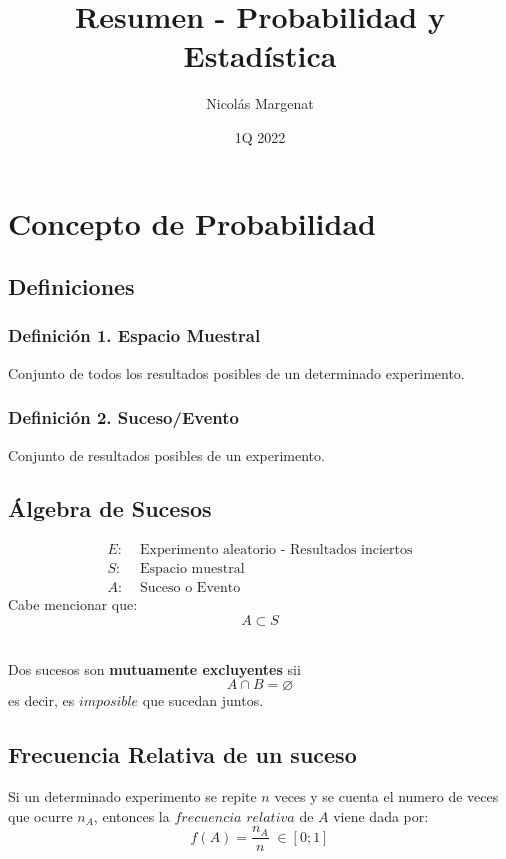 \documentclass{article}
\title{Resumen - Probabilidad y Estadística}
\author{Nicolás Margenat}
\date{1Q 2022}
\begin{document}
\maketitle
\tableofcontents

\newpage
\section{Concepto de Probabilidad}
\subsection{Definiciones}
\subsubsection*{Definición 1. Espacio Muestral}
Conjunto de todos los resultados posibles de un determinado experimento.

\subsubsection*{Definición 2. Suceso/Evento}
Conjunto de resultados posibles de un experimento.


\subsection{Álgebra de Sucesos}
\begin{align*}
    E:& \text{ Experimento aleatorio - Resultados inciertos} \\
    S:& \text{ Espacio muestral} \\
    A:& \text{ Suceso o Evento}
\end{align*}
Cabe mencionar que:
\begin{equation*}
    A \subset S
\end{equation*}

\leavevmode\\ Dos sucesos son \textbf{mutuamente excluyentes} sii
\begin{equation*}
    A \cap B = \varnothing
\end{equation*}
es decir, es $imposible$ que sucedan juntos.


\subsection{Frecuencia Relativa de un suceso}
Si un determinado experimento se repite $n$ veces y se cuenta el numero de veces que ocurre $n_A$, entonces
la $frecuencia$ $relativa$ de $A$ viene dada por:
\begin{equation*}
    f(A) = \frac{n_A}{n} \; \in [0;1]
\end{equation*}
\end{document}
